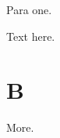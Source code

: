 \documentclass{article}
\begin{document}
Para one.

\label{a}
Text here.
\section{B}
\label{b}\label{c}
More.
\end{document}
